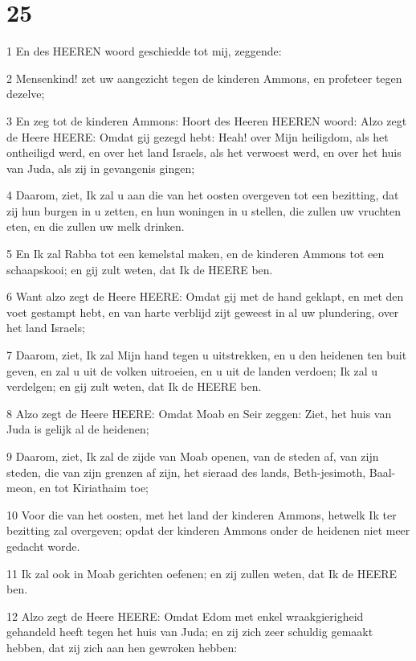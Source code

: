 \chapter{25}

\par 1 En des HEEREN woord geschiedde tot mij, zeggende:
\par 2 Mensenkind! zet uw aangezicht tegen de kinderen Ammons, en profeteer tegen dezelve;
\par 3 En zeg tot de kinderen Ammons: Hoort des Heeren HEEREN woord: Alzo zegt de Heere HEERE: Omdat gij gezegd hebt: Heah! over Mijn heiligdom, als het ontheiligd werd, en over het land Israels, als het verwoest werd, en over het huis van Juda, als zij in gevangenis gingen;
\par 4 Daarom, ziet, Ik zal u aan die van het oosten overgeven tot een bezitting, dat zij hun burgen in u zetten, en hun woningen in u stellen, die zullen uw vruchten eten, en die zullen uw melk drinken.
\par 5 En Ik zal Rabba tot een kemelstal maken, en de kinderen Ammons tot een schaapskooi; en gij zult weten, dat Ik de HEERE ben.
\par 6 Want alzo zegt de Heere HEERE: Omdat gij met de hand geklapt, en met den voet gestampt hebt, en van harte verblijd zijt geweest in al uw plundering, over het land Israels;
\par 7 Daarom, ziet, Ik zal Mijn hand tegen u uitstrekken, en u den heidenen ten buit geven, en zal u uit de volken uitroeien, en u uit de landen verdoen; Ik zal u verdelgen; en gij zult weten, dat Ik de HEERE ben.
\par 8 Alzo zegt de Heere HEERE: Omdat Moab en Seir zeggen: Ziet, het huis van Juda is gelijk al de heidenen;
\par 9 Daarom, ziet, Ik zal de zijde van Moab openen, van de steden af, van zijn steden, die van zijn grenzen af zijn, het sieraad des lands, Beth-jesimoth, Baal-meon, en tot Kiriathaim toe;
\par 10 Voor die van het oosten, met het land der kinderen Ammons, hetwelk Ik ter bezitting zal overgeven; opdat der kinderen Ammons onder de heidenen niet meer gedacht worde.
\par 11 Ik zal ook in Moab gerichten oefenen; en zij zullen weten, dat Ik de HEERE ben.
\par 12 Alzo zegt de Heere HEERE: Omdat Edom met enkel wraakgierigheid gehandeld heeft tegen het huis van Juda; en zij zich zeer schuldig gemaakt hebben, dat zij zich aan hen gewroken hebben:
